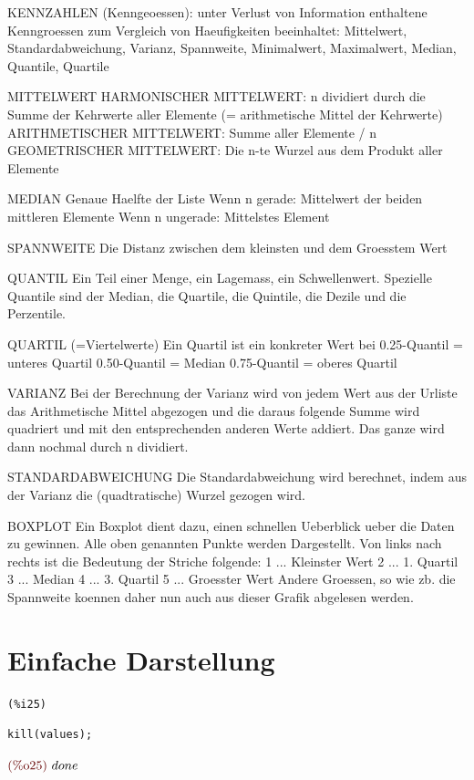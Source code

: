 \documentclass{article}
\begin{document}
KENNZAHLEN (Kenngeoessen): unter Verlust von Information enthaltene Kenngroessen zum Vergleich von Haeufigkeiten
    beeinhaltet: Mittelwert, Standardabweichung, Varianz, Spannweite, Minimalwert, Maximalwert, Median, Quantile, Quartile

MITTELWERT
    HARMONISCHER MITTELWERT:
      n dividiert durch die Summe der Kehrwerte aller Elemente (= arithmetische Mittel der Kehrwerte)
    ARITHMETISCHER MITTELWERT:
      Summe aller Elemente / n 
    GEOMETRISCHER MITTELWERT:
        Die n-te Wurzel aus dem Produkt aller Elemente

MEDIAN
    Genaue Haelfte der Liste
        Wenn n gerade: Mittelwert der beiden mittleren Elemente
        Wenn n ungerade: Mittelstes Element

SPANNWEITE
    Die Distanz zwischen dem kleinsten und dem Groesstem Wert

QUANTIL
    Ein Teil einer Menge, ein Lagemass, ein Schwellenwert.
    Spezielle Quantile sind der Median, die Quartile, die Quintile, die Dezile und die Perzentile.


QUARTIL (=Viertelwerte)
     Ein Quartil ist ein konkreter Wert bei
        0.25-Quantil = unteres Quartil
        0.50-Quantil = Median
        0.75-Quantil = oberes Quartil

VARIANZ
    Bei der Berechnung der Varianz wird von jedem Wert aus der Urliste das Arithmetische Mittel abgezogen und
    die daraus folgende Summe wird quadriert und mit den entsprechenden anderen Werte addiert.
    Das ganze wird dann nochmal durch n dividiert.

STANDARDABWEICHUNG
    Die Standardabweichung wird berechnet, indem aus der Varianz die (quadtratische) Wurzel gezogen wird.

BOXPLOT
    Ein Boxplot dient dazu, einen schnellen Ueberblick ueber die Daten zu gewinnen.
    Alle oben genannten Punkte werden Dargestellt.
    Von links nach rechts ist die Bedeutung der Striche folgende:
        1 ... Kleinster Wert
        2 ... 1. Quartil
        3 ... Median
        4 ... 3. Quartil
        5 ... Groesster Wert
    Andere Groessen, so wie zb. die Spannweite koennen daher nun auch aus dieser Grafik abgelesen werden.


\section{Einfache Darstellung}



\noindent
\begin{minipage}[t]{8ex}{\color{red}\bf
\begin{verbatim}
(%i25) 
\end{verbatim}}
\end{minipage}
\begin{minipage}[t]{\textwidth}{\color{blue}
\begin{verbatim}
kill(values);
\end{verbatim}}
\end{minipage}
\begin{math}\displaystyle
\parbox{8ex}{\color{labelcolor}(\%o25) }
done
\end{math}
\end{document}
